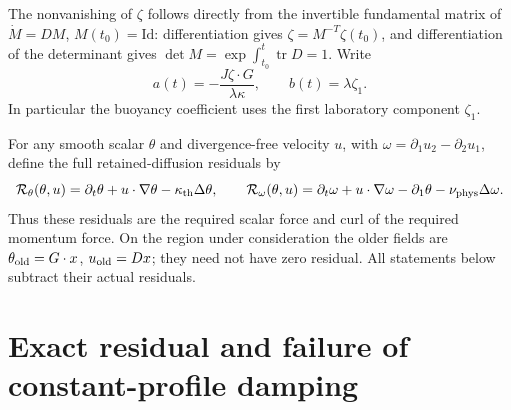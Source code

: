 The nonvanishing of $\zeta$ follows directly from the invertible fundamental
matrix of $\dot M=DM$, $M(t_0)=\mathrm{Id}$: differentiation gives
$\zeta=M^{-T}\zeta(t_0)$, and differentiation of the determinant gives
$\det M=\exp\int_{t_0}^t\operatorname{tr}D=1$.
Write
\begin{equation}\label{pd:eq:ab}
 a(t)=-\frac{J\zeta\cdot G}{\lambda\kappa},\qquad
 b(t)=\lambda\zeta_1.
\end{equation}
In particular the buoyancy coefficient uses the first laboratory component
$\zeta_1$.

For any smooth scalar $\theta$ and divergence-free velocity $u$, with
$\omega=\partial_1u_2-\partial_2u_1$, define the full retained-diffusion
residuals by
\begin{equation}\label{pd:eq:resdef}
 \mathcal R_\theta(\theta,u)
  =\partial_t\theta+u\cdot\nabla\theta-\kappa_{\rm th}\Delta\theta,
 \qquad
 \mathcal R_\omega(\theta,u)
  =\partial_t\omega+u\cdot\nabla\omega-\partial_1\theta-\nu_{\rm phys}\Delta\omega.
\end{equation}
Thus these residuals are the required scalar force and curl of the required
momentum force. On the region under consideration the older fields are
$\theta_{\rm old}=G\cdot x$, $u_{\rm old}=Dx$; they need not have zero
residual. All statements below subtract their actual residuals.

\section{Exact residual and failure of constant-profile damping}

